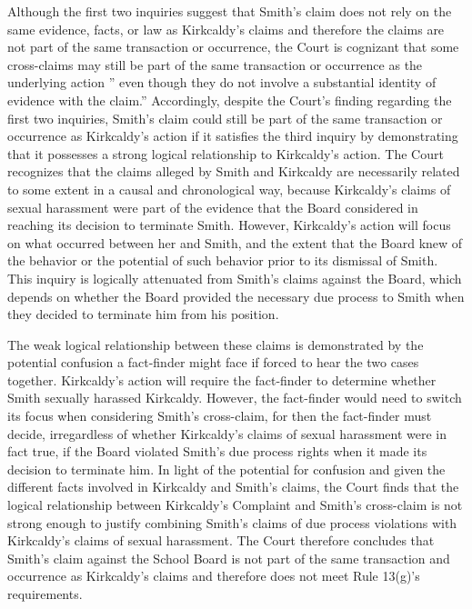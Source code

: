 \documentclass[11pt,letterpaper,twoside]{article}
\begin{document}
Although the first two inquiries suggest that Smith's claim does not
rely on the same evidence, facts, or law as Kirkcaldy's claims and
therefore the claims are not part of the same transaction or occurrence,
the Court is cognizant that some cross-claims may still be part of the
same transaction or occurrence as the underlying action '' even though
they do not involve a substantial identity of evidence with the claim.''
Accordingly, despite the Court's finding regarding the first two
inquiries, Smith's claim could still be part of the same transaction or
occurrence as Kirkcaldy's action if it satisfies the third inquiry by
demonstrating that it possesses a strong logical relationship to
Kirkcaldy's action. The Court recognizes that the claims alleged by
Smith and Kirkcaldy are necessarily related to some extent in a causal
and chronological way, because Kirkcaldy's claims of sexual harassment
were part of the evidence that the Board considered in reaching its
decision to terminate Smith. However, Kirkcaldy's action will focus on
what occurred between her and Smith, and the extent that the Board knew
of the behavior or the potential of such behavior prior to its dismissal
of Smith. This inquiry is logically attenuated from Smith's claims
against the Board, which depends on whether the Board provided the
necessary due process to Smith when they decided to terminate him from
his position.

The weak logical relationship between these claims is demonstrated by
the potential confusion a fact-finder might face if forced to hear the
two cases together. Kirkcaldy's action will require the fact-finder to
determine whether Smith sexually harassed Kirkcaldy. However, the
fact-finder would need to switch its focus when considering Smith's
cross-claim, for then the fact-finder must decide, irregardless of
whether Kirkcaldy's claims of sexual harassment were in fact true, if
the Board violated Smith's due process rights when it made its decision
to terminate him. In light of the potential for confusion and given the
different facts involved in Kirkcaldy and Smith's claims, the Court
finds that the logical relationship between Kirkcaldy's Complaint and
Smith's cross-claim is not strong enough to justify combining Smith's
claims of due process violations with Kirkcaldy's claims of sexual
harassment. The Court therefore concludes that Smith's claim against the
School Board is not part of the same transaction and occurrence as
Kirkcaldy's claims and therefore does not meet Rule 13(g)'s
requirements.
\end{document}
